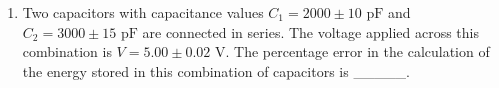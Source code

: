 
\begin{enumerate}
    \item Two capacitors with capacitance values \(C_1 = 2000 \pm 10 \text{ pF}\) and \(C_2 = 3000 \pm 15 \text{ pF}\) are connected in series. The voltage applied across this combination is \(V = 5.00 \pm 0.02 \text{ V}\). The percentage error in the calculation of the energy stored in this combination of capacitors is \_\_\_\_\_.
\end{enumerate}
